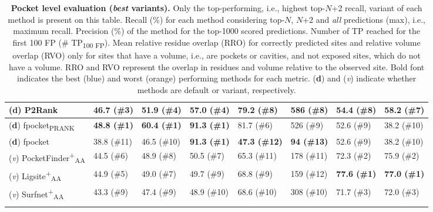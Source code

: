 \begin{landscape}
\begin{longtable}[c]{|M{33mm}|M{28mm}|M{31mm}|M{26mm}|M{29mm}|M{19mm}|M{18mm}|M{18mm}|}
\footnotesize{(\textbf{d})} P2Rank             & 46.7 (\#3)           & 51.9 (\#4)             & 57.0 (\#4)           & 79.2 (\#8)           & 586 (\#8)         & 54.4 (\#8)     & 58.2 (\#7)   \\ \hline
\footnotesize{(\textbf{d})} fpocket\textsubscript{PRANK}       & \textbf{\textcolor{CBBlue}{48.8 (\#1)}}           & \textbf{\textcolor{CBBlue}{60.4 (\#1)}} & \textbf{\textcolor{CBBlue}{91.3 (\#1)}}         & 81.7 (\#6)           & 526 (\#9)        & 52.6 (\#9)     & 38.2 (\#10)     \\ \hline
\footnotesize{(\textbf{d})} fpocket        & 38.8 (\#11)           & 46.5 (\#10)             & \textbf{\textcolor{CBBlue}{91.3 (\#1)}}         & \textbf{\textcolor{CBOrange}{47.3 (\#12)}}          & \textbf{\textcolor{CBOrange}{94 (\#13)}}          & 52.6 (\#9)     & 38.2 (\#10)     \\ \hline
\footnotesize{(\textit{v})} PocketFinder\textsuperscript{+}\textsubscript{AA}    & 44.5 (\#6)          & 48.9 (\#8)            & 50.5 (\#7)        & 65.3 (\#11)           & 178 (\#11)         & 72.3 (\#2)     & 75.9 (\#2)     \\ \hline
\footnotesize{(\textit{v})} Ligsite\textsuperscript{+}\textsubscript{AA}         & 44.9 (\#5)          & 49.0 (\#7)              & 49.7 (\#9)        & 68.8 (\#9)          & 159 (\#12)         & \textbf{\textcolor{CBBlue}{77.6 (\#1)}}     & \textbf{\textcolor{CBBlue}{77.0 (\#1)}}     \\ \hline
\footnotesize{(\textit{v})} Surfnet\textsuperscript{+}\textsubscript{AA}         & 43.3 (\#9)          & 47.4 (\#9)            & 48.9 (\#10)        & 68.6 (\#10)          & 308 (\#10)         & 71.7 (\#3)     & 72.0 (\#3)     \\ \hline
\caption[Pocket level evaluation (\textit{best} variants)]{\textbf{Pocket level evaluation (\textit{best} variants).} Only the top-performing, i.e., highest top-$N$+2 recall, variant of each method is present on this table. Recall (\%) for each method considering top-$N$, $N$+2 and \textit{all} predictions (max), i.e., maximum recall. Precision (\%) of the method for the top-1000 scored predictions. Number of TP reached for the first 100 FP (\# TP\textsubscript{100 FP}). Mean relative residue overlap (RRO) for correctly predicted sites and relative volume overlap (RVO) only for sites that have a volume, i.e., are pockets or cavities, and not exposed sites, which do not have a volume. RRO and RVO represent the overlap in residues and volume relative to the observed site. Bold font indicates the best (blue) and worst (orange) performing methods for each metric. (\textbf{d}) and (\textit{v}) indicate whether methods are default or variant, respectively.}
\label{tab:pocket_level_benchmark_variants}\\
\end{longtable}
\end{landscape}
\endgroup

